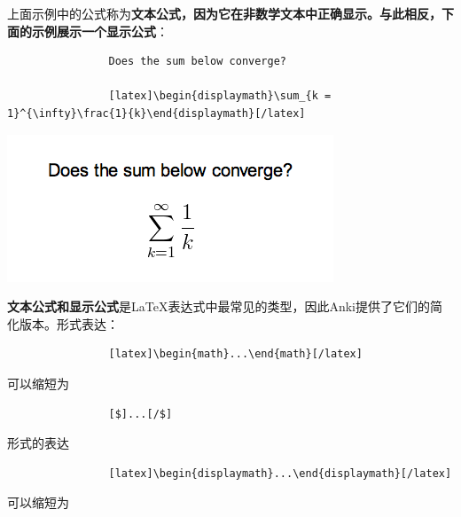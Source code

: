 \documentclass[a4paper]{book}
\begin{document}
			上面示例中的公式称为\textbf{文本公式，因为它在非数学文本中正确显示。与此相反，下面的示例展示一个显示公式}：
			
			\begin{shaded}\begin{verbatim}
				Does the sum below converge?
				
				[latex]\begin{displaymath}\sum_{k = 1}^{\infty}\frac{1}{k}\end{displaymath}[/latex]
				\end{verbatim}\end{shaded}
			
			\includegraphics{figures/convergence-question-2.png}
			
			\textbf{文本公式和显示公式}是LaTeX表达式中最常见的类型，因此Anki提供了它们的简化版本。形式表达：
			
			\begin{shaded}\begin{verbatim}
				[latex]\begin{math}...\end{math}[/latex]
				\end{verbatim}\end{shaded}
			
			可以缩短为
			
			\begin{shaded}\begin{verbatim}
				[$]...[/$]
				\end{verbatim}\end{shaded}
			
			形式的表达
			
			\begin{shaded}\begin{verbatim}
				[latex]\begin{displaymath}...\end{displaymath}[/latex]
				\end{verbatim}\end{shaded}
			
			可以缩短为
			
\end{document}
